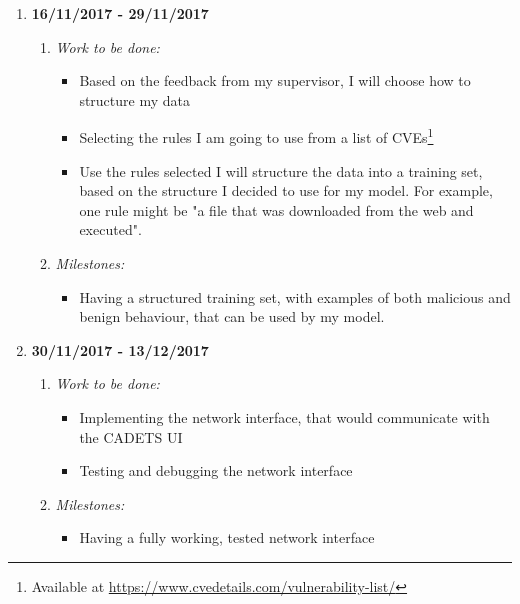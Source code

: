 \begin{enumerate}
	\vspace{5mm}
	
	\item \textbf{16/11/2017 - 29/11/2017}
		\begin{enumerate}
			\item \emph{Work to be done:}
			\begin{itemize}
				\item Based on the feedback from my supervisor, I will choose how to structure my data
				\item Selecting the rules I am going to use from a list of CVEs\footnote{Available at \url{https://www.cvedetails.com/vulnerability-list/}}
				\item Use the rules selected I will structure the data into a training set, based on the structure I decided to use for my model. For example, one rule might be "a file that was downloaded from the web and executed".
			\end{itemize}
			\item \emph{Milestones:}
			\begin{itemize}
				\item Having a structured training set, with examples of both malicious and benign behaviour, that can be used by my model.
			\end{itemize}
		\end{enumerate}
	
	\vspace{5mm}
	
	\item \textbf{30/11/2017 - 13/12/2017}
		\begin{enumerate}
			\item \emph{Work to be done:}
			\begin{itemize}
				\item Implementing the network interface, that would communicate with the CADETS UI
				\item Testing and debugging the network interface
			\end{itemize}
			\item \emph{Milestones:}
			\begin{itemize}
				\item Having a fully working, tested network interface 
			\end{itemize}
		\end{enumerate}
	
	

	\vspace{5mm}
	

\end{enumerate}
